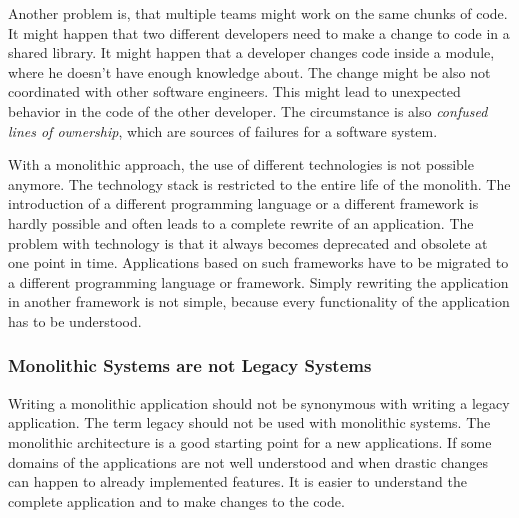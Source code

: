 Another problem is, that multiple teams might work on the same chunks of code. It might happen that two different developers need to make a change to code in a shared library. It might happen that a developer changes code inside a module, where he doesn't have enough knowledge about. The change might be also not coordinated with other software engineers. This might lead to unexpected behavior in the code of the other developer. The circumstance is also \textit{confused lines of ownership}, which are sources of failures for a software system. \cite{book:2020:newman:background:monolith:monolith-to-microservices} \cite{inproceedings:2011:bird:background:monoliths:dont-touch-my-code}

With a monolithic approach, the use of different technologies is not possible anymore. The technology stack is restricted to the entire life of the monolith. The introduction of a different programming language or a different framework is hardly possible and often leads to a complete rewrite of an application. \cite{book:2018:richardson:background:bff:microservices-patterns} The problem with technology is that it always becomes deprecated and obsolete at one point in time. Applications based on such frameworks have to be migrated to a different programming language or framework. Simply rewriting the application in another framework is not simple, because every functionality of the application has to be understood.

\subsubsection{Monolithic Systems are not Legacy Systems}

Writing a monolithic application should not be synonymous with writing a legacy application. The term legacy should not be used with monolithic systems. \cite{book:2020:newman:background:monolith:monolith-to-microservices} The monolithic architecture is a good starting point for a new applications. If some domains of the applications are not well understood and when drastic changes can happen to already implemented features. It is easier to understand the complete application and to make changes to the code. \cite{book:2020:newman:background:monolith:monolith-to-microservices} 